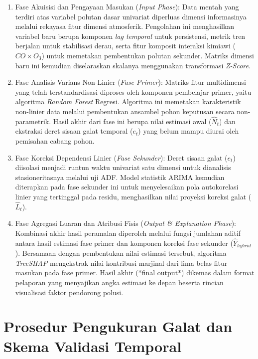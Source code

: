 \begin{enumerate}
   \item {Fase Akuisisi dan Pengayaan Masukan (\textit{Input Phase}):} 
   Data mentah yang terdiri atas variabel polutan dasar univariat diperluas dimensi informasinya melalui rekayasa fitur dimensi atmosferik. Pengolahan ini menghasilkan variabel baru berupa komponen \textit{lag temporal} untuk persistensi, metrik tren berjalan untuk stabilisasi derau, serta fitur komposit interaksi kimiawi ($CO \times O_3$) untuk memetakan pembentukan polutan sekunder. Matriks dimensi baru ini kemudian diselaraskan skalanya menggunakan transformasi \textit{Z-Score}.

   \item {Fase Analisis Varians Non-Linier (\textit{Fase Primer}):} 
   Matriks fitur multidimensi yang telah terstandardisasi diproses oleh komponen pembelajar primer, yaitu algoritma \textit{Random Forest} Regresi. Algoritma ini memetakan karakteristik non-linier data melalui pembentukan ansambel pohon keputusan secara non-parametrik. Hasil akhir dari fase ini berupa nilai estimasi awal ($\hat{N}_t$) dan ekstraksi deret sisaan galat temporal ($e_t$) yang belum mampu diurai oleh pemisahan cabang pohon.
   
   \item {Fase Koreksi Dependensi Linier (\textit{Fase Sekunder}):} 
   Deret sisaan galat ($e_t$) diisolasi menjadi runtun waktu univariat satu dimensi untuk dianalisis stasioneritasnya melalui uji ADF. Model statistik ARIMA kemudian diterapkan pada fase sekunder ini untuk menyelesaikan pola autokorelasi linier yang tertinggal pada residu, menghasilkan nilai proyeksi koreksi galat ($\hat{L}_t$).
   
   \item {Fase Agregasi Luaran dan Atribusi Fisis (\textit{Output \& Explanation Phase}):} 
   Kombinasi akhir hasil peramalan diperoleh melalui fungsi jumlahan aditif antara hasil estimasi fase primer dan komponen koreksi fase sekunder ($\hat{Y}_{hybrid}$). Bersamaan dengan pembentukan nilai estimasi tersebut, algoritma \textit{TreeSHAP} mengekstrak nilai kontribusi marjinal dari lima belas fitur masukan pada fase primer. Hasil akhir (*final output*) dikemas dalam format pelaporan yang menyajikan angka estimasi ke depan beserta rincian visualisasi faktor pendorong polusi.
\end{enumerate}

\section{Prosedur Pengukuran Galat dan Skema Validasi Temporal}

